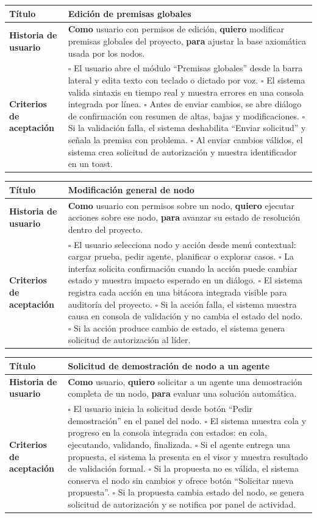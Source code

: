 \documentclass{article}
\newcommand{\story}[3]{
\begin{table}[H]
    \centering
    \begin{tabularx}{\textwidth}{| >{\raggedright\arraybackslash\bfseries\columncolor{leftheaderbg}}p{2.5cm} | >{\raggedright\arraybackslash\columncolor{contentbg}}X |}
        \hline
        Título & #1 \\
        \hline
        Historia de usuario & #2 \\
        \hline
        Criterios de aceptación & #3 \\
        \hline
    \end{tabularx}
\end{table}
}
\begin{document}
\story
{Edición de premisas globales}
{\textbf{Como} usuario con permisos de edición, \textbf{quiero} modificar premisas globales del proyecto, \textbf{para} ajustar la base axiomática usada por los nodos.}
{$\square$ El usuario abre el módulo ``Premisas globales'' desde la barra lateral y edita texto con teclado o dictado por voz. \newline
$\square$ El sistema valida sintaxis en tiempo real y muestra errores en una consola integrada por línea. \newline
$\square$ Antes de enviar cambios, se abre diálogo de confirmación con resumen de altas, bajas y modificaciones. \newline
$\square$ Si la validación falla, el sistema deshabilita ``Enviar solicitud'' y señala la premisa con problema. \newline
$\square$ Al enviar cambios válidos, el sistema crea solicitud de autorización y muestra identificador en un toast.}

\story
{Modificación general de nodo}
{\textbf{Como} usuario con permisos sobre un nodo, \textbf{quiero} ejecutar acciones sobre ese nodo, \textbf{para} avanzar su estado de resolución dentro del proyecto.}
{$\square$ El usuario selecciona nodo y acción desde menú contextual: cargar prueba, pedir agente, planificar o explorar casos. \newline
$\square$ La interfaz solicita confirmación cuando la acción puede cambiar estado y muestra impacto esperado en un diálogo. \newline
$\square$ El sistema registra cada acción en una bitácora integrada visible para auditoría del proyecto. \newline
$\square$ Si la acción falla, el sistema muestra causa en consola de validación y no cambia el estado del nodo. \newline
$\square$ Si la acción produce cambio de estado, el sistema genera solicitud de autorización al líder.}

\story
{Solicitud de demostración de nodo a un agente}
{\textbf{Como} usuario, \textbf{quiero} solicitar a un agente una demostración completa de un nodo, \textbf{para} evaluar una solución automática.}
{$\square$ El usuario inicia la solicitud desde botón ``Pedir demostración'' en el panel del nodo. \newline
$\square$ El sistema muestra cola y progreso en la consola integrada con estados: en cola, ejecutando, validando, finalizada. \newline
$\square$ Si el agente entrega una propuesta, el sistema la presenta en el visor y muestra resultado de validación formal. \newline
$\square$ Si la propuesta no es válida, el sistema conserva el nodo sin cambios y ofrece botón ``Solicitar nueva propuesta''. \newline
$\square$ Si la propuesta cambia estado del nodo, se genera solicitud de autorización y se notifica por panel de actividad.}
\end{document}
